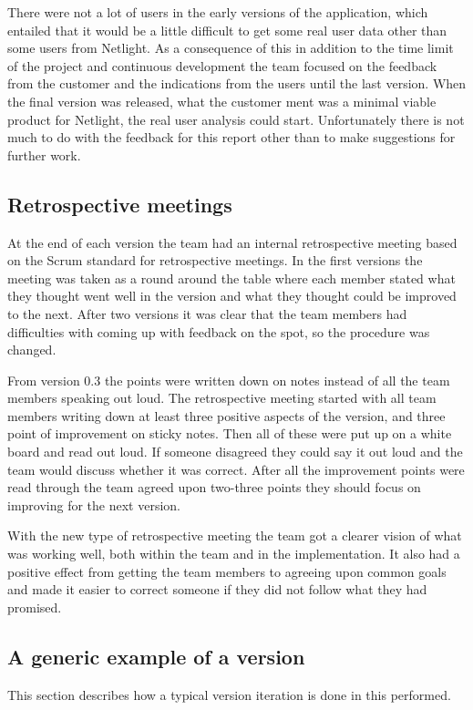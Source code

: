 There were not a lot of users in the early versions of the application, which entailed that it would be a little difficult to get some real user data other than some users from Netlight. As a consequence of this in addition to  the time limit of the project and continuous development the team focused on the feedback from the customer and the indications from the users until the last version. When the final version was released, what the customer ment was a minimal viable product for Netlight, the real user analysis could start. Unfortunately there is not much to do with the feedback for this report other than to make suggestions for further work.
  

\subsection{Retrospective meetings}
\label{retrospective-intro}
At the end of each version the team had an internal retrospective meeting based on the Scrum standard for retrospective meetings.\cite{scrum-retrospective}  In the first versions the meeting was taken as a round around the table where each member stated what they thought went well in the version and what they thought could be improved to the next. After two versions it was clear that the team members had difficulties with coming up with feedback on the spot, so the procedure was changed. 

From version 0.3 the points were written down on notes instead of all the team members speaking out loud. The retrospective meeting started with all team members writing down at least three positive aspects of the version, and three point of improvement on sticky notes. Then all of these were put up on a white board and read out loud. If someone disagreed they could say it out loud and the team would discuss whether it was correct. After all the improvement points were read through the team agreed upon two-three points they should focus on improving for the next version.

With the new type of retrospective meeting the team got a clearer vision of what was working well, both within the team and in the implementation. It also had a positive effect from getting the team members to agreeing upon common goals and made it easier to correct someone if they did not follow what they had promised.

\subsection{A generic example of a version}
\label{generic-example}
This section describes how a typical version iteration is done in this performed. 

